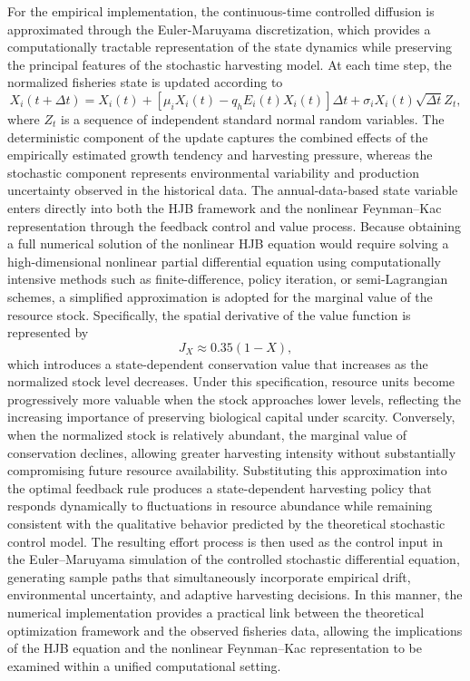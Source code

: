 \documentclass[11pt]{article}
\begin{document}
	For the empirical implementation, the continuous-time controlled diffusion is approximated through the Euler-Maruyama discretization, which provides a computationally tractable representation of the state dynamics while preserving the principal features of the stochastic harvesting model. At each time step, the normalized fisheries state is updated according to
	\[
	X_i(t+\Delta t)
	=
	X_i(t)
	+
	\left[
	\mu_iX_i(t)-q_hE_i(t)X_i(t)
	\right]\Delta t
	+
	\sigma_iX_i(t)\sqrt{\Delta t}Z_t,
	\]
	where $Z_t$ is a sequence of independent standard normal random variables. The deterministic component of the update captures the combined effects of the empirically estimated growth tendency and harvesting pressure, whereas the stochastic component represents environmental variability and production uncertainty observed in the historical data. The annual-data-based state variable enters directly into both the HJB framework and the nonlinear Feynman--Kac representation through the feedback control and value process. Because obtaining a full numerical solution of the nonlinear HJB equation would require solving a high-dimensional nonlinear partial differential equation using computationally intensive methods such as finite-difference, policy iteration, or semi-Lagrangian schemes, a simplified approximation is adopted for the marginal value of the resource stock. Specifically, the spatial derivative of the value function is represented by
	\[
	J_X\approx 0.35(1-X),
	\]
	which introduces a state-dependent conservation value that increases as the normalized stock level decreases. Under this specification, resource units become progressively more valuable when the stock approaches lower levels, reflecting the increasing importance of preserving biological capital under scarcity. Conversely, when the normalized stock is relatively abundant, the marginal value of conservation declines, allowing greater harvesting intensity without substantially compromising future resource availability. Substituting this approximation into the optimal feedback rule produces a state-dependent harvesting policy that responds dynamically to fluctuations in resource abundance while remaining consistent with the qualitative behavior predicted by the theoretical stochastic control model. The resulting effort process is then used as the control input in the Euler--Maruyama simulation of the controlled stochastic differential equation, generating sample paths that simultaneously incorporate empirical drift, environmental uncertainty, and adaptive harvesting decisions. In this manner, the numerical implementation provides a practical link between the theoretical optimization framework and the observed fisheries data, allowing the implications of the HJB equation and the nonlinear Feynman--Kac representation to be examined within a unified computational setting.
	
\end{document}

